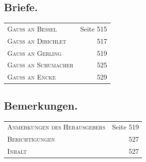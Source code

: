 \documentclass[10pt,a4paper]{article}
\begin{document}
\medskip

\subsection*{Briefe.}

\begin{tabular}{p{8cm} r}
\textsc{Gau\ss{} an Bessel} & Seite 515 \\
\textsc{Gau\ss{} an Dirichlet} & 517 \\
\textsc{Gau\ss{} an Gerling} & 519 \\
\textsc{Gau\ss{} an Schumacher} & 525 \\
\textsc{Gau\ss{} an Encke} & 529 \\
\end{tabular}

\medskip

\subsection*{Bemerkungen.}

\begin{tabular}{p{8cm} r}
\textsc{Anmerkungen des Herausgebers} & Seite 519 \\
\textsc{Berichtigungen} & 527 \\
\textsc{Inhalt} & 527 \\
\end{tabular}
\end{document}
